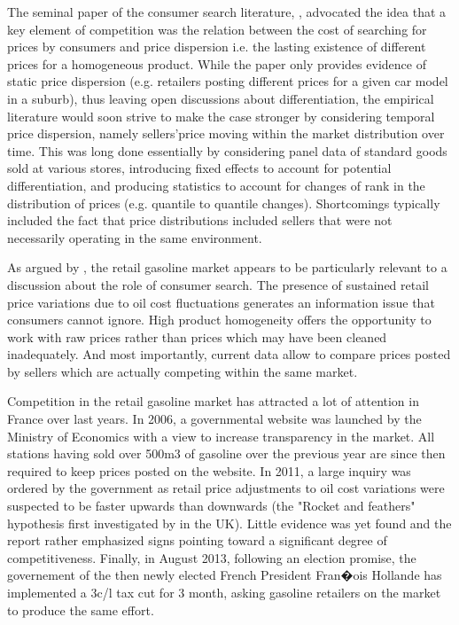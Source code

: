 \documentclass[11pt]{article}
\begin{document}
The seminal paper of the consumer search literature, \cite{STI61}, advocated the idea that a key element of competition was the relation between the cost of searching for prices by consumers and price dispersion i.e. the lasting existence of different prices for a homogeneous product. While the paper only provides evidence of static price dispersion (e.g. retailers posting different prices for a given car model in a suburb), thus leaving open discussions about differentiation, the empirical literature would soon strive to make the case stronger by considering temporal price dispersion, namely sellers'price moving within the market distribution over time. This was long done essentially by considering panel data of standard goods sold at various stores, introducing fixed effects to account for potential differentiation, and producing statistics to account for changes of rank in the distribution of prices (e.g. quantile to quantile changes). Shortcomings typically included the fact that price distributions included sellers that were not necessarily operating in the same environment.

As argued by \cite{TAP11}, the retail gasoline market appears to be particularly relevant to a discussion about the role of consumer search. The presence of sustained retail price variations due to oil cost fluctuations generates an information issue that consumers cannot ignore. High product homogeneity offers the opportunity to work with raw prices rather than prices which may have been cleaned inadequately. And most importantly, current data allow to compare prices posted by sellers which are actually competing within the same market.

Competition in the retail gasoline market has attracted a lot of attention in France over last years. In 2006, a governmental website was launched by the Ministry of Economics with a view to increase transparency in the market. All stations having sold over 500m3 of gasoline over the previous year are since then required to keep prices posted on the website. In 2011, a large inquiry was ordered by the government as retail price adjustments to oil cost variations were suspected to be faster upwards than downwards (the "Rocket and feathers" hypothesis first investigated by \cite{BAC91} in the UK). Little evidence was yet found and the report rather emphasized signs pointing toward a significant degree of competitiveness. Finally, in August 2013, following an election promise, the governement of the then newly elected French President Fran�ois Hollande has implemented a 3c/l tax cut for 3 month, asking gasoline retailers on the market to produce the same effort.
\end{document}
